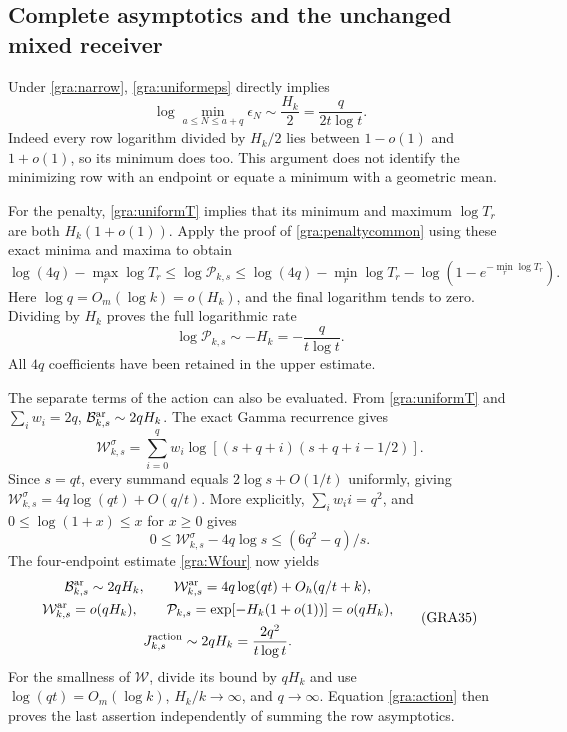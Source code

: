 \documentclass[11pt,a4paper]{article}
\begin{document}
\subsection{Complete asymptotics and the unchanged mixed receiver}

Under \eqref{gra:narrow}, \eqref{gra:uniformeps} directly implies
\begin{equation}
 \log\min_{a\le N\le a+q}\epsilon_N\sim\frac{H_k}{2}
 =\frac{q}{2t\log t}.
 \tag{GRA33}\label{gra:minasymp}
\end{equation}
Indeed every row logarithm divided by $H_k/2$ lies between $1-o(1)$
and $1+o(1)$, so its minimum does too.  This argument does not identify
the minimizing row with an endpoint or equate a minimum with a geometric
mean.

For the penalty, \eqref{gra:uniformT} implies that its minimum and maximum
$\log T_r$ are both $H_k(1+o(1))$.  Apply the proof of
\eqref{gra:penaltycommon} using these exact minima and maxima to obtain
\[
 \log(4q)-\max_r\log T_r\le\log\mathcal P_{k,s}
 \le\log(4q)-\min_r\log T_r
     -\log(1-e^{-\min_r\log T_r}).
\]
Here $\log q=O_m(\log k)=o(H_k)$, and the final logarithm tends to zero.
Dividing by $H_k$ proves the full logarithmic rate
\begin{equation}
 \log\mathcal P_{k,s}\sim-H_k=-\frac{q}{t\log t}.
 \tag{GRA34}\label{gra:Pasymp}
\end{equation}
All $4q$ coefficients have been retained in the upper estimate.

The separate terms of the action can also be evaluated.  From
\eqref{gra:uniformT} and $\sum_iw_i=2q$,
$\mathcal B_{k,s}^{\rm ar}\sim2qH_k$.  The exact Gamma recurrence gives
\[
 \mathcal W_{k,s}^{\sigma}
 =\sum_{i=0}^qw_i\log[(s+q+i)(s+q+i-1/2)].
\]
Since $s=qt$, every summand equals $2\log s+O(1/t)$ uniformly, giving
$\mathcal W_{k,s}^{\sigma}=4q\log(qt)+O(q/t)$.
More explicitly, $\sum_iw_ii=q^2$, and $0\le\log(1+x)\le x$ for
$x\ge0$ gives
\[
 0\le\mathcal W_{k,s}^{\sigma}-4q\log s
 \le (6q^2-q)/s.
\]
The four-endpoint estimate \eqref{gra:Wfour} now yields
\begin{equation}
 \begin{gathered}
 \mathcal B_{k,s}^{\rm ar}\sim2qH_k,\qquad
 \mathcal W_{k,s}^{\rm ar}=4q\log(qt)+O_h(q/t+k),\\
 \mathcal W_{k,s}^{\rm ar}=o(qH_k),\qquad
 \mathcal P_{k,s}=\exp[-H_k(1+o(1))]=o(qH_k),\\
 J_{k,s}^{\rm action}\sim2qH_k=\frac{2q^2}{t\log t}.
 \end{gathered}\tag{GRA35}\label{gra:actionasymp}
\end{equation}
For the smallness of $\mathcal W$, divide its bound by $qH_k$ and use
$\log(qt)=O_m(\log k)$, $H_k/k\to\infty$, and $q\to\infty$.
Equation \eqref{gra:action} then proves the last assertion independently
of summing the row asymptotics.
\end{document}
